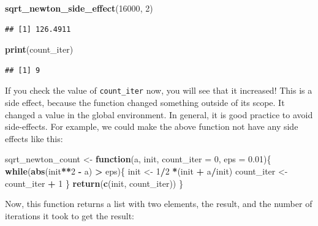 \documentclass[]{gitbook}
\newenvironment{Shaded}{\begin{snugshade}}{\end{snugshade}}
\newcommand{\ControlFlowTok}[1]{\textcolor[rgb]{0.13,0.29,0.53}{\textbf{#1}}}
\newcommand{\DataTypeTok}[1]{\textcolor[rgb]{0.13,0.29,0.53}{#1}}
\newcommand{\DecValTok}[1]{\textcolor[rgb]{0.00,0.00,0.81}{#1}}
\newcommand{\FloatTok}[1]{\textcolor[rgb]{0.00,0.00,0.81}{#1}}
\newcommand{\KeywordTok}[1]{\textcolor[rgb]{0.13,0.29,0.53}{\textbf{#1}}}
\newcommand{\NormalTok}[1]{#1}
\newcommand{\OperatorTok}[1]{\textcolor[rgb]{0.81,0.36,0.00}{\textbf{#1}}}
\newcommand{\StringTok}[1]{\textcolor[rgb]{0.31,0.60,0.02}{#1}}
\begin{document}
\begin{Shaded}
\begin{Highlighting}[]
\KeywordTok{sqrt_newton_side_effect}\NormalTok{(}\DecValTok{16000}\NormalTok{, }\DecValTok{2}\NormalTok{)}
\end{Highlighting}
\end{Shaded}

\begin{verbatim}
## [1] 126.4911
\end{verbatim}

\begin{Shaded}
\begin{Highlighting}[]
\KeywordTok{print}\NormalTok{(count_iter)}
\end{Highlighting}
\end{Shaded}

\begin{verbatim}
## [1] 9
\end{verbatim}

If you check the value of \texttt{count\_iter} now, you will see that it increased! This is a side effect,
because the function changed something outside of its scope. It changed a value in the global
environment. In general, it is good practice to avoid side-effects. For example, we could make the
above function not have any side effects like this:

\begin{Shaded}
\begin{Highlighting}[]
\NormalTok{sqrt_newton_count <-}\StringTok{ }\ControlFlowTok{function}\NormalTok{(a, init, }\DataTypeTok{count_iter =} \DecValTok{0}\NormalTok{, }\DataTypeTok{eps =} \FloatTok{0.01}\NormalTok{)\{}
    \ControlFlowTok{while}\NormalTok{(}\KeywordTok{abs}\NormalTok{(init}\OperatorTok{**}\DecValTok{2} \OperatorTok{-}\StringTok{ }\NormalTok{a) }\OperatorTok{>}\StringTok{ }\NormalTok{eps)\{}
\NormalTok{        init <-}\StringTok{ }\DecValTok{1}\OperatorTok{/}\DecValTok{2} \OperatorTok{*}\NormalTok{(init }\OperatorTok{+}\StringTok{ }\NormalTok{a}\OperatorTok{/}\NormalTok{init)}
\NormalTok{        count_iter <-}\StringTok{ }\NormalTok{count_iter }\OperatorTok{+}\StringTok{ }\DecValTok{1}
\NormalTok{    \}}
    \KeywordTok{return}\NormalTok{(}\KeywordTok{c}\NormalTok{(init, count_iter))}
\NormalTok{\}}
\end{Highlighting}
\end{Shaded}

Now, this function returns a list with two elements, the result, and the number of iterations it
took to get the result:
\end{document}
